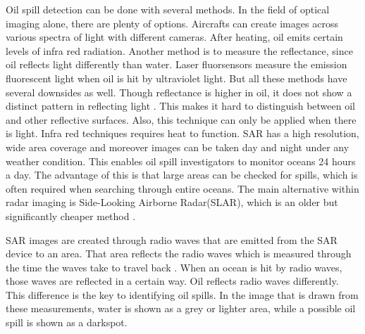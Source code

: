 Oil spill detection can be done with several methods. In the field of optical imaging alone, there are plenty of options. Aircrafts can create images across various spectra of light with different cameras. After heating, oil emits certain levels of infra red radiation. Another method is to measure the reflectance, since oil reflects light differently than water. Laser fluorsensors measure the emission fluorescent light when oil is hit by ultraviolet light. But all these methods have several downsides as well. Though reflectance is higher in oil, it does not show a distinct pattern in reflecting light \cite{fingas2014review}. This makes it hard to distinguish between oil and other reflective surfaces. Also, this technique can only be applied when there is light. Infra red techniques requires heat to function.
SAR has a high resolution, wide area coverage and moreover images can be taken day and night under any weather condition. This enables oil spill investigators to monitor oceans 24 hours a day\cite{Chang20081915}. The advantage of this is that large areas can be checked for spills, which is often required when searching through entire oceans. 
The main alternative within radar imaging is Side-Looking Airborne Radar(SLAR), which is an older but significantly cheaper method \cite{fingas2014review}. 

SAR images are created through radio waves that are emitted from the SAR device to an area. That area reflects the radio waves which is measured through the time the waves take to travel back  \cite{Doerry:04}. When an ocean is hit by radio waves, those waves are reflected in a certain way. Oil reflects radio waves differently. This difference is the key to identifying oil spills.
In the image that is drawn from these measurements, water is shown as a grey or lighter area, while a possible oil spill is shown as a darkspot.








